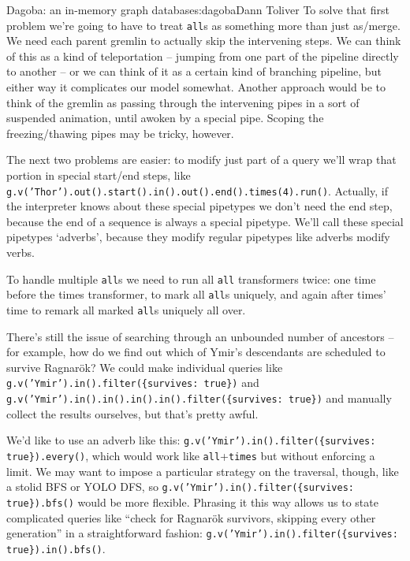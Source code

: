 \begin{aosachapter}{Dagoba: an in-memory graph database}{s:dagoba}{Dann Toliver}
To solve that first problem we're going to have to treat \texttt{all}s
as something more than just as/merge. We need each parent gremlin to
actually skip the intervening steps. We can think of this as a kind of
teleportation -- jumping from one part of the pipeline directly to
another -- or we can think of it as a certain kind of branching
pipeline, but either way it complicates our model somewhat. Another
approach would be to think of the gremlin as passing through the
intervening pipes in a sort of suspended animation, until awoken by a
special pipe. Scoping the freezing/thawing pipes may be tricky, however.

The next two problems are easier: to modify just part of a query we'll
wrap that portion in special start/end steps, like
\texttt{g.v('Thor').out().start().in().out().end().times(4).run()}.
Actually, if the interpreter knows about these special pipetypes we
don't need the end step, because the end of a sequence is always a
special pipetype. We'll call these special pipetypes `adverbs', because
they modify regular pipetypes like adverbs modify verbs.

To handle multiple \texttt{all}s we need to run all \texttt{all}
transformers twice: one time before the times transformer, to mark all
\texttt{all}s uniquely, and again after times' time to remark all marked
\texttt{all}s uniquely all over.

There's still the issue of searching through an unbounded number of
ancestors -- for example, how do we find out which of Ymir's descendants
are scheduled to survive Ragnarök? We could make individual queries like
\texttt{g.v('Ymir').in().filter(\{survives: true\})} and
\texttt{g.v('Ymir').in().in().in().in().filter(\{survives: true\})} and
manually collect the results ourselves, but that's pretty awful.

We'd like to use an adverb like this:
\texttt{g.v('Ymir').in().filter(\{survives: true\}).every()}, which
would work like \texttt{all}+\texttt{times} but without enforcing a
limit. We may want to impose a particular strategy on the traversal,
though, like a stolid BFS or YOLO DFS, so
\texttt{g.v('Ymir').in().filter(\{survives: true\}).bfs()} would be more
flexible. Phrasing it this way allows us to state complicated queries
like ``check for Ragnarök survivors, skipping every other generation''
in a straightforward fashion:
\texttt{g.v('Ymir').in().filter(\{survives: true\}).in().bfs()}.

\label{wrapping-up}


\end{aosachapter}
